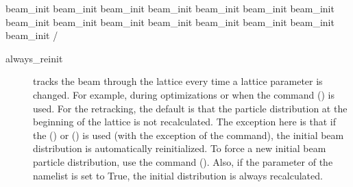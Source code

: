 {{{{{{{{{{{\begin{example}
    beam_init%
    beam_init%
    beam_init%
    beam_init%
    beam_init%
    beam_init%
    beam_init%
    beam_init%
    beam_init%
    beam_init%
    beam_init%
    beam_init%
    beam_init%
    beam_init%
    beam_init%
  /
\end{example}

\begin{description}
%
\item[always_reinit] \Newline
\tao tracks the beam through the lattice every time a lattice parameter is changed. For example,
during optimizations or when the  command () is used. For the retracking, the
default is that the particle distribution at the beginning of the lattice is not recalculated. The
exception here is that if the  () or 
() is used (with the exception of the  command), the
initial beam distribution is automatically reinitialized. To force a new initial beam particle
distribution, use the  command (). Also, if the
 parameter of the  namelist is set to True, the initial
distribution is always recalculated.


\end{description}}}}}}}}}}}}
